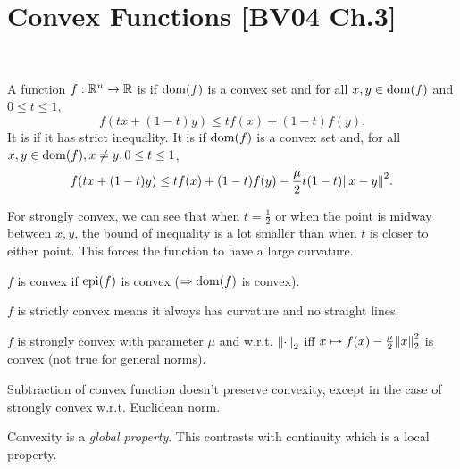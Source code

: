 \documentclass[class=article,crop=false]{standalone}
\begin{document}
\newpage
\section{Convex Functions [BV04 Ch.3]}

~\begin{defn}
	A function $ f: \mathbb{R}^{n} \to \mathbb{R}$ is  if $ \operatorname{dom}(f)$ is a convex set and for all $ x,y \in \operatorname{dom}(f)$ and $ 0\leq t \leq 1$,
	 \[
		 f(tx + (1-t)y)\leq tf(x) + (1-t)f(y)
	.\] 
	It is  if it has strict inequality. It is  if $ \operatorname{dom}(f)$ is a convex set and, for all $ x,y \in \operatorname{dom}(f), x\neq y, 0\leq t \leq 1$,
	\[
		f(tx + (1-t)y) \leq tf(x) + (1-t)f(y) - \frac{\mu}{2} t(1-t) {\left\lVert{ x-y}\right\rVert}^2 
	.\] 
\end{defn}
\begin{intuition}
	For strongly convex, we can see that when $ t=\frac{1}{2}$ or when the point is midway between $ x,y$, the bound of inequality is a lot smaller than when  $ t$ is closer to either point. This forces the function to have a large curvature.
\end{intuition}

\begin{thm}
	$ f$ is convex if  $ \operatorname{epi} (f)$ is convex ($\Rightarrow \operatorname{dom}(f)$ is convex).
	
	$ f$ is strictly convex means it always has curvature and no straight lines.

	$ f$ is strongly convex with parameter  $ \mu$ and w.r.t. $ {\left\lVert{ \cdot }\right\rVert}_2 $ iff $ x \mapsto f(x) - \frac{\mu}{2} {\left\lVert{ x}\right\rVert}_2^2 $ is convex (not true for general norms). 
\end{thm}
\begin{note}
Subtraction of convex function doesn't preserve convexity, except in the case of strongly convex w.r.t. Euclidean norm.
\end{note}

\begin{remark}
Convexity is a \emph{global property}. This contrasts with continuity which is a local property.  
\end{remark}
\end{document}
